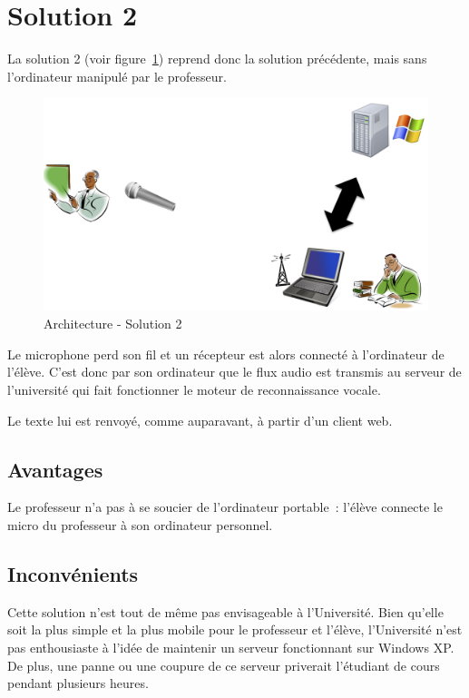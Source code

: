 \section{Solution 2}

La solution 2 (voir figure~\ref{fig:solution2}) reprend donc la solution précédente, mais sans l'ordinateur manipulé par le professeur.

\begin{figure}[h]
 \centering
 \includegraphics[scale=0.5]{./images/solution2.png}
 \caption{Architecture - Solution 2}
 \label{fig:solution2}
\end{figure}

Le microphone perd son fil et un récepteur est alors connecté à l'ordinateur de l'élève.
C'est donc par son ordinateur que le flux audio est transmis au serveur de l'université qui fait fonctionner le moteur de reconnaissance vocale.

Le texte lui est renvoyé, comme auparavant, à partir d'un client web.

\subsection{Avantages}
Le professeur n'a pas à se soucier de l'ordinateur portable~: l'élève connecte le micro du professeur à son ordinateur personnel.

\subsection{Inconvénients}
Cette solution n'est tout de même pas envisageable à l'Université. Bien qu'elle soit la plus simple et la plus mobile pour le professeur et l'élève, l'Université n'est pas enthousiaste à l'idée de maintenir un serveur fonctionnant sur Windows XP.
De plus, une panne ou une coupure de ce serveur priverait l'étudiant de cours pendant plusieurs heures.

